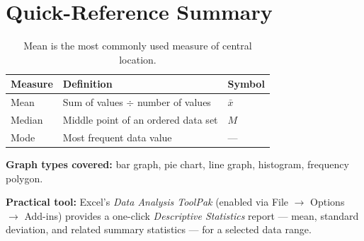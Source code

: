 \documentclass[11pt]{article}
\begin{document}
	\section{Quick-Reference Summary}
	
	\begin{table}[h!]
		\centering
		\begin{tabular}{@{}lll@{}}
			\toprule
			\textbf{Measure} & \textbf{Definition} & \textbf{Symbol} \\
			\midrule
			Mean & Sum of values $\div$ number of values & $\bar{x}$ \\
			Median & Middle point of an ordered data set & $M$ \\
			Mode & Most frequent data value & --- \\
			\bottomrule
		\end{tabular}
		\caption*{\small Mean is the most commonly used measure of central location.}
	\end{table}
	
	\noindent\textbf{Graph types covered:} bar graph, pie chart, line graph, histogram, frequency polygon.
	
	\begin{notebox}
		\textbf{Practical tool:} Excel's \emph{Data Analysis ToolPak} (enabled via File $\to$ Options $\to$ Add-ins) provides a one-click \emph{Descriptive Statistics} report --- mean, standard deviation, and related summary statistics --- for a selected data range.
	\end{notebox}
	
\end{document}
